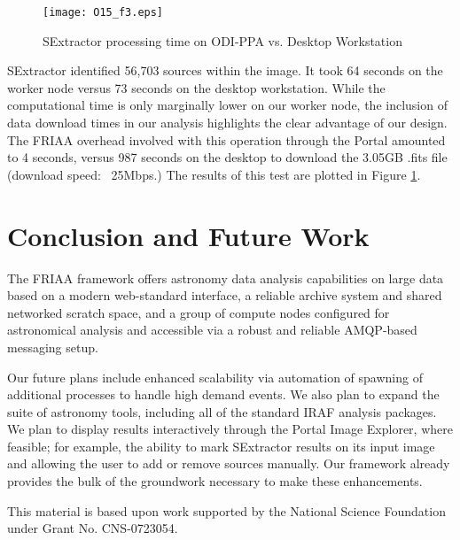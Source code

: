 \documentclass[11pt,twoside]{article}
\begin{document}
\begin{figure}[ht]
\texttt{[image: O15\_f3.eps]}
\caption{SExtractor processing time on ODI-PPA vs. Desktop Workstation}
\label{fig:sex_run}
\end{figure}

SExtractor identified 56,703 sources within the image. It took 64 seconds on the worker node versus 73 seconds on the desktop workstation.  While the computational time is only marginally lower on our worker node, the inclusion of data download times in our analysis highlights the clear advantage of our design.  The FRIAA overhead involved with this operation through the Portal amounted to 4 seconds, versus 987 seconds on the desktop to download the 3.05GB .fits file (download speed: ~25Mbps.)  The results of this test are plotted in Figure \ref{fig:sex_run}.

\section{Conclusion and Future Work}

The FRIAA framework offers astronomy data analysis capabilities on large data based on a modern web-standard interface, a reliable archive system and shared networked scratch space, and a group of compute nodes configured for astronomical analysis and accessible via a robust and reliable AMQP-based messaging setup. 

Our future plans include enhanced scalability via automation of spawning of additional processes to handle high demand events.  We also plan to expand the suite of astronomy tools, including all of the standard IRAF analysis packages.  We plan to display results interactively through the Portal Image Explorer, where feasible; for example, the ability to mark SExtractor results on its input image and allowing the user to add or remove sources manually.  Our framework already provides the bulk of the groundwork necessary to make these enhancements.  

 
\acknowledgements 
This material is based upon work supported by the National Science Foundation under Grant No. CNS-0723054.  


  
\end{document}
